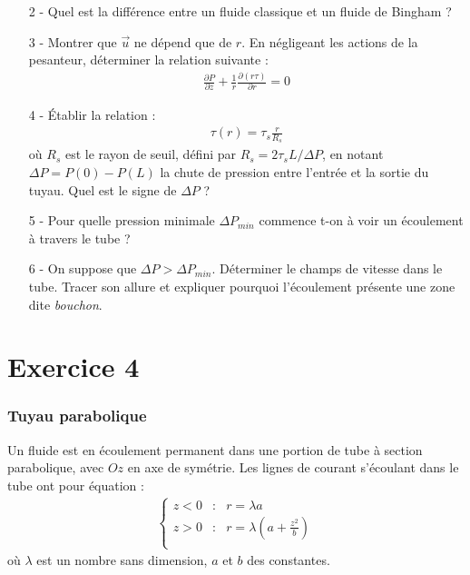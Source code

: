 \documentclass{report}
\begin{document}
\begin{itemize}
	\item[2 - ] Quel est la différence entre un fluide classique et un fluide de Bingham ?

	\item[3 - ] Montrer que $\vec{u}$ ne dépend que de $r$. En négligeant les actions de la pesanteur, déterminer la relation suivante : 
	\begin{align*}
		\frac{\partial P}{\partial z} + \frac{1}{r}\frac{\partial (r\tau)}{\partial r}=0
	\end{align*}
	\item[4 - ] Établir la relation :
	\begin{align*}
		\tau(r) = \tau_s\frac{r}{R_s}
	\end{align*}
	où $R_s$ est le rayon de seuil, défini par $R_s=2\tau_s L/\Delta P$, en notant $\Delta P = P(0)-P(L)$ la chute de pression entre l'entrée et la sortie du tuyau. Quel est le signe de $\Delta P$ ?

	\item[5 - ] Pour quelle pression minimale $\Delta P_{min}$ commence t-on à voir un écoulement à travers le tube ?
	
	\item[6 - ] On suppose que $\Delta P>\Delta P_{min}$. Déterminer le champs de vitesse dans le tube. Tracer son allure et expliquer pourquoi l'écoulement présente une zone dite \textit{bouchon}.
	
	
\end{itemize}

\newpage

\section*{Exercice 4}

\subsubsection*{Tuyau parabolique}

Un fluide est en écoulement permanent dans une portion de tube à section parabolique, avec $Oz$ en axe de symétrie. Les lignes de courant s'écoulant dans le tube ont pour équation :
\begin{align*}
		\left\lbrace
\begin{array}{ccc}
z<0 & : & r=\lambda a \\
z>0 & : & r=\lambda \left(a+\frac{z^2}{b} \right) \\
\end{array}\right.
\end{align*}
où $\lambda$ est un nombre sans dimension, $a$ et $b$ des constantes. 
\end{document}
